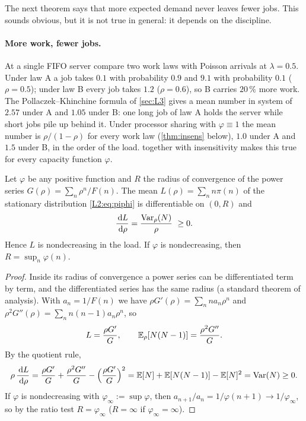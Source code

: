 The next theorem says that more expected demand never leaves fewer jobs. This sounds
obvious, but it is not true in general: it depends on the discipline.

\paragraph{More work, fewer jobs.} At a single FIFO server compare two work laws with
Poisson arrivals at $\lambda=0.5$. Under law A a job takes $0.1$ with probability $0.9$
and $9.1$ with probability $0.1$ ($\rho=0.5$); under law B every job takes $1.2$
($\rho=0.6$), so B carries $20\,\%$ more work. The Pollaczek--Khinchine formula of
\cref{sec:L3} gives a mean number in system of $2.57$ under A and $1.05$ under B: one
long job of law A holds the server while short jobs pile up behind it. Under processor
sharing with $\varphi\equiv1$ the mean number is $\rho/(1-\rho)$ for every work law
(\cref{thm:insens} below), $1.0$ under A and $1.5$ under B, in the order of the load.
 together with insensitivity makes this true for every capacity
function $\varphi$.

\begin{theorem}\label{thm:L-mono}
Let $\varphi$ be any positive function and $R$ the radius of convergence of the power
series $G(\rho)=\sum_n\rho^n/F(n)$. The mean $L(\rho)=\sum_n n\pi(n)$ of the stationary
distribution \eqref{L2:eq:piphi} is differentiable on $(0,R)$ and
\[
  \frac{\,\mathrm{d} L}{\,\mathrm{d}\rho}=\frac{\operatorname{Var}_\rho(N)}{\rho}\ \ge 0 .
\]
Hence $L$ is nondecreasing in the load. If $\varphi$ is nondecreasing, then
$R=\sup_n\varphi(n)$.
\end{theorem}
\begin{proof}
Inside its radius of convergence a power series can be differentiated term by term,
and the differentiated series has the same radius (a standard theorem of analysis).
With $a_n=1/F(n)$ we have $\rho G'(\rho)=\sum_n n a_n\rho^n$ and
$\rho^2G''(\rho)=\sum_n n(n-1)a_n\rho^n$, so
\[
  L=\frac{\rho G'}{G},\qquad \mathbb{E}_\rho[N(N-1)]=\frac{\rho^2G''}{G}.
\]
By the quotient rule,
\[
  \rho\,\frac{\,\mathrm{d} L}{\,\mathrm{d}\rho}
  =\frac{\rho G'}{G}+\frac{\rho^2G''}{G}-\Bigl(\frac{\rho G'}{G}\Bigr)^2
  =\mathbb{E}[N]+\mathbb{E}[N(N-1)]-\mathbb{E}[N]^2=\operatorname{Var}(N)\ge0 .
\]
If $\varphi$ is nondecreasing with $\varphi_\infty:=\sup\varphi$, then
$a_{n+1}/a_n=1/\varphi(n+1)\to1/\varphi_\infty$, so by the ratio test
$R=\varphi_\infty$ ($R=\infty$ if $\varphi_\infty=\infty$).
\end{proof}

